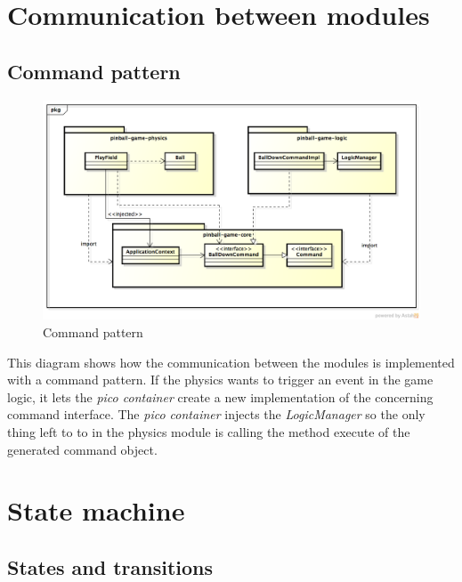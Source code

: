 \documentclass[fontsize=12pt,
               paper=a4,
               twoside=false,
               parskip=half,
               ]{scrartcl}
\begin{document}
\section{Communication between modules}
\subsection{Command pattern}

\begin{figure}[h!]
	\centering
	\includegraphics[width=15.5cm]{./img/command-pattern1.png}
	\caption[Command pattern]{Command pattern}
	\label{fig:command_pattern}
\end{figure}

This diagram shows how the communication between the modules is implemented with a command pattern. If the physics wants to trigger an event in the game logic, it lets the \emph{pico container} create a new implementation of the concerning command interface. The \emph{pico container} injects the \emph{LogicManager} so the only thing left to to in the physics module is calling the method execute of the generated command object.


\section{State machine}

\subsection{States and transitions}
\end{document}
